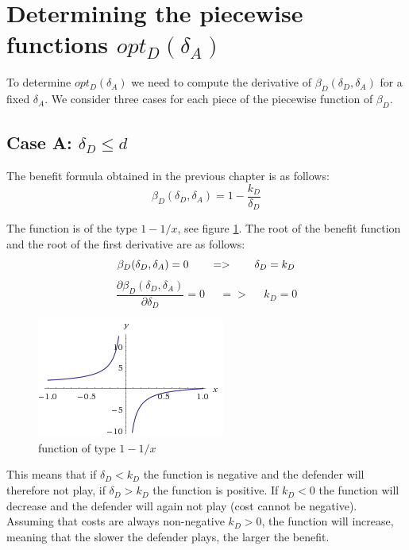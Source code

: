 \section{Determining the piecewise functions $opt_{D}(\delta_{A})$}

To determine $opt_{D}(\delta_{A})$ we need to compute the derivative of  $\beta_{D}(\delta_{D},\delta_{A}) $ for a fixed $\delta_{A}$.
 We consider three cases for each piece of the piecewise function of $\beta_{D}$.
 
 
\subsection*{Case A: $\delta_{D} \leq d$}

The benefit formula obtained in the previous chapter is as follows:
\begin{equation}
\beta_{D}(\delta_{D},\delta_{A}) = 1 - \dfrac{k_{D}}{\delta_{D}}
\end{equation}


The function is of the type $1-1/x$, see figure \ref{1x}. The root of the benefit function  and the root of the first derivative are as follows:
\begin{equation}
\beta_{D}(\delta_{D},\delta_{A}) =0  ~~~~~~ =>~~~~~~\delta_{D} = k_{D} \\
\end{equation}
\begin{equation}
\dfrac{\partial \beta_{D}(\delta_{D},\delta_{A})}{\partial \delta_{D}} =0 ~~~~~~ =>~~~~~~ k_{D} = 0
\end{equation}

\begin{figure}[hbtp]
\centering
\includegraphics[scale=1]{Images/1x.png}
\caption{function of type $1-1/x$}
\label{1x}
\end{figure}

This means that if $\delta_{D} < k_{D}$  the function is negative and the defender will therefore not play, if $\delta_{D} > k_{D}$ the function is positive. If $k_{D} < 0$ the function will decrease and the defender will again not play (cost cannot be negative).  Assuming that costs are always non-negative $k_{D} > 0$, the function will increase, meaning that the slower the defender plays, the larger the benefit.



